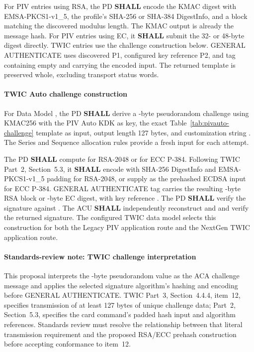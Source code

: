 For PIV entries using RSA, the PD \textbf{SHALL} encode the KMAC digest with
EMSA-PKCS1-v1\_5, the profile's SHA-256 or SHA-384 DigestInfo, and a block matching
the discovered modulus length. The KMAC output is already the message hash. For PIV
entries using EC, it \textbf{SHALL} submit the 32- or 48-byte digest directly.
TWIC entries use the challenge construction below.
GENERAL AUTHENTICATE uses discovered P1, configured key reference P2, and tag 
containing empty  and  carrying the encoded input. The returned
 template is preserved whole, excluding transport status words.

\paragraph{TWIC Auto challenge construction}\label{sec:pivauto-twic-challenge}
For Data Model , the PD \textbf{SHALL} derive a -byte
pseudorandom challenge  using KMAC256 with the PIV Auto KDK as key, the
exact Table~\ref{tab:pivauto-challenge} template as input, output length 127 bytes,
and customization string . The Series and
Sequence allocation rules provide a fresh input for each attempt.

The PD \textbf{SHALL} compute  for RSA-2048 or
 for ECC P-384. Following TWIC Part~2, Section~5.3, it
\textbf{SHALL} encode  with SHA-256 DigestInfo and EMSA-PKCS1-v1\_5 padding
for RSA-2048, or supply  as the prehashed ECDSA input for ECC P-384.
GENERAL AUTHENTICATE tag  carries the resulting -byte RSA
block or -byte EC digest, with key reference . The PD
\textbf{SHALL} verify the signature against . The ACU \textbf{SHALL}
independently reconstruct  and  and verify the returned signature.
The configured TWIC data model selects this construction for both the Legacy PIV
application route and the NextGen TWIC application route.

\paragraph{Standards-review note: TWIC challenge interpretation}
This proposal interprets the -byte pseudorandom value as the ACA
challenge message and applies the selected signature algorithm's hashing and
encoding before GENERAL AUTHENTICATE. TWIC Part~3, Section~4.4.4, item~12,
specifies transmission of at least 127 bytes of unique challenge data; Part~2,
Section~5.3, specifies the card command's padded hash input and algorithm
references. Standards review must resolve the relationship between that literal
transmission requirement and the proposed RSA/ECC prehash construction before
accepting conformance to item~12.

